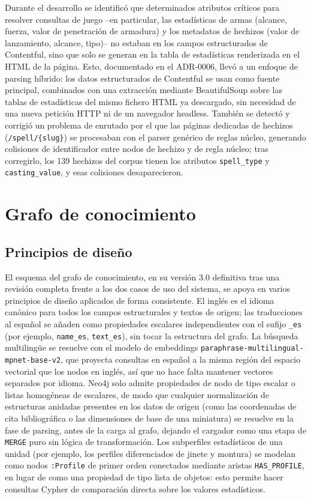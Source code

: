 \documentclass[11pt,a4paper,spanish]{book}
\numberwithin{equation}{chapter}
\numberwithin{figure}{chapter}
\numberwithin{table}{chapter}
\begin{document}
Durante el desarrollo se identificó que determinados atributos críticos para resolver consultas de juego --en particular, las estadísticas de armas (alcance, fuerza, valor de penetración de armadura) y los metadatos de hechizos (valor de lanzamiento, alcance, tipo)-- no estaban en los campos estructurados de Contentful, sino que solo se generan en la tabla de estadísticas renderizada en el HTML de la página. Esto, documentado en el ADR-0006, llevó a un enfoque de parsing híbrido: los datos estructurados de Contentful se usan como fuente principal, combinados con una extracción mediante BeautifulSoup sobre las tablas de estadísticas del mismo fichero HTML ya descargado, sin necesidad de una nueva petición HTTP ni de un navegador headless. También se detectó y corrigió un problema de enrutado por el que las páginas dedicadas de hechizos (\texttt{/spell/\{slug\}}) se procesaban con el parser genérico de reglas núcleo, generando colisiones de identificador entre nodos de hechizo y de regla núcleo; tras corregirlo, los 139 hechizos del corpus tienen los atributos \texttt{spell\_type} y \texttt{casting\_value}, y esas colisiones desaparecieron.

\section{Grafo de conocimiento}

\subsection{Principios de diseño}

El esquema del grafo de conocimiento, en su versión 3.0 definitiva tras una revisión completa frente a los dos casos de uso del sistema, se apoya en varios principios de diseño aplicados de forma consistente. El inglés es el idioma canónico para todos los campos estructurales y textos de origen; las traducciones al español se añaden como propiedades escalares independientes con el sufijo \texttt{\_es} (por ejemplo, \texttt{name\_es}, \texttt{text\_es}), sin tocar la estructura del grafo. La búsqueda multilingüe se resuelve con el modelo de embeddings \texttt{paraphrase-multilingual-mpnet-base-v2}, que proyecta consultas en español a la misma región del espacio vectorial que los nodos en inglés, así que no hace falta mantener vectores separados por idioma. Neo4j solo admite propiedades de nodo de tipo escalar o listas homogéneas de escalares, de modo que cualquier normalización de estructuras anidadas presentes en los datos de origen (como las coordenadas de cita bibliográfica o las dimensiones de base de una miniatura) se resuelve en la fase de parsing, antes de la carga al grafo, dejando el cargador como una etapa de \texttt{MERGE} puro sin lógica de transformación. Los subperfiles estadísticos de una unidad (por ejemplo, los perfiles diferenciados de jinete y montura) se modelan como nodos \texttt{:Profile} de primer orden conectados mediante aristas \texttt{HAS\_PROFILE}, en lugar de como una propiedad de tipo lista de objetos: esto permite hacer consultas Cypher de comparación directa sobre los valores estadísticos.
\end{document}
